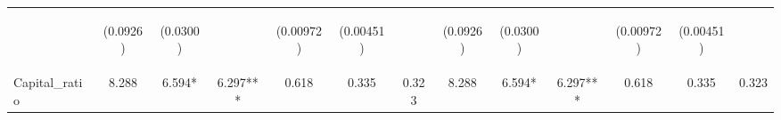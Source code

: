 \documentclass[]{article}
\begin{document}
\begin{center}
\begin{tabular}{lcccccccccccc}
\vspace{4pt} & \begin{footnotesize}(0.0926)\end{footnotesize} & \begin{footnotesize}(0.0300)\end{footnotesize} & \begin{footnotesize}\end{footnotesize} & \begin{footnotesize}(0.00972)\end{footnotesize} & \begin{footnotesize}(0.00451)\end{footnotesize} & \begin{footnotesize}\end{footnotesize} & \begin{footnotesize}(0.0926)\end{footnotesize} & \begin{footnotesize}(0.0300)\end{footnotesize} & \begin{footnotesize}\end{footnotesize} & \begin{footnotesize}(0.00972)\end{footnotesize} & \begin{footnotesize}(0.00451)\end{footnotesize} & \begin{footnotesize}\end{footnotesize} \\
Capital\_ratio & 8.288 & 6.594* & 6.297*** & 0.618 & 0.335 & 0.323 & 8.288 & 6.594* & 6.297*** & 0.618 & 0.335 & 0.323 \\

\end{tabular}
\end{center}
\end{document}
